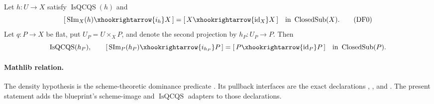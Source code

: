 \begin{lemma}
  \label{lemma:nagata-dense-flat-pullback}
  \leanok

  Let $h\colon U\to X$ satisfy $\operatorname{IsQCQS}(h)$ and
  \[
    [\,\operatorname{SIm}_X(h)\xhookrightarrow{i_h}X\,]
      =[\,X\xhookrightarrow{\operatorname{id}_X}X\,]
      \quad\text{in }\operatorname{ClosedSub}(X).                \tag{DF0}
  \]
  Let $q\colon P\to X$ be flat,
  put $U_P=U\times_XP$, and denote the second projection by
  $h_P\colon U_P\to P$.  Then
  \[
    \operatorname{IsQCQS}(h_P),
    \qquad
    [\,\operatorname{SIm}_P(h_P)\xhookrightarrow{i_{h_P}}P\,]
      =[\,P\xhookrightarrow{\operatorname{id}_P}P\,]
      \quad\text{in }\operatorname{ClosedSub}(P).
  \]

  \paragraph{Mathlib relation.}
  The density hypothesis is the scheme-theoretic dominance predicate
  \texttt{}.
  Its pullback interfaces are the exact declarations
  \texttt{},
  \texttt{}, and
  \texttt{}.  The
  present statement adds the blueprint's scheme-image and
  $\operatorname{IsQCQS}$ adapters to those declarations.
\end{lemma}

